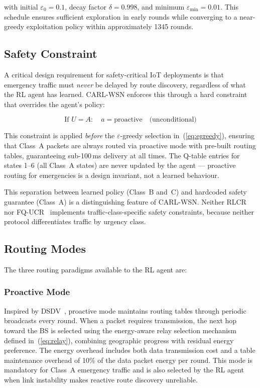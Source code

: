 \documentclass[12pt]{article}
\begin{document}
with initial $\varepsilon_0 = 0.1$, decay factor $\delta = 0.998$, and minimum $\varepsilon_{\min} = 0.01$. This schedule
ensures sufficient exploration in early rounds while converging to a near-greedy exploitation
policy within approximately 1345 rounds.

\subsection{Safety Constraint}

A critical design requirement for safety-critical IoT deployments is
that emergency traffic must \emph{never} be delayed by route
discovery, regardless of what the RL agent has learned. CARL-WSN
enforces this through a hard constraint that overrides the agent's
policy:

\begin{equation}
\text{If } U = A: \quad a = \text{proactive} \quad \text{(unconditional)}
\label{eq:safety}
\end{equation}

This constraint is applied \emph{before} the $\varepsilon$-greedy
selection in~(\ref{eq:egreedy}), ensuring that Class~A packets are
always routed via proactive mode with pre-built routing tables,
guaranteeing sub-100\,ms delivery at all times. The Q-table entries
for states 1--6 (all Class~A states) are never updated by the agent
--- proactive routing for emergencies is a design invariant, not a
learned behaviour.

This separation between learned policy (Class~B and~C) and hardcoded
safety guarantee (Class~A) is a distinguishing feature of CARL-WSN.
Neither RLCR~\cite{daanoune_intelligent_2026} nor
FQ-UCR~\cite{wang_fqucr_2025} implements traffic-class-specific
safety constraints, because neither protocol differentiates traffic
by urgency class.

\subsection{Routing Modes}

The three routing paradigms available to the RL agent are:

\subsubsection{Proactive Mode}\label{sec:proactive}
Inspired by DSDV~\cite{perkins1994}, proactive mode maintains routing
tables through periodic broadcasts every round. When a packet requires
transmission, the next hop toward the BS is selected using the
energy-aware relay selection mechanism defined in~(\ref{eq:relay}),
combining geographic progress with residual energy preference.
The energy overhead includes both data transmission cost and a table
maintenance overhead of 10\% of the data packet energy per round.
This mode is mandatory for Class~A emergency traffic and is also
selected by the RL agent when link instability makes reactive
route discovery unreliable.
\end{document}
